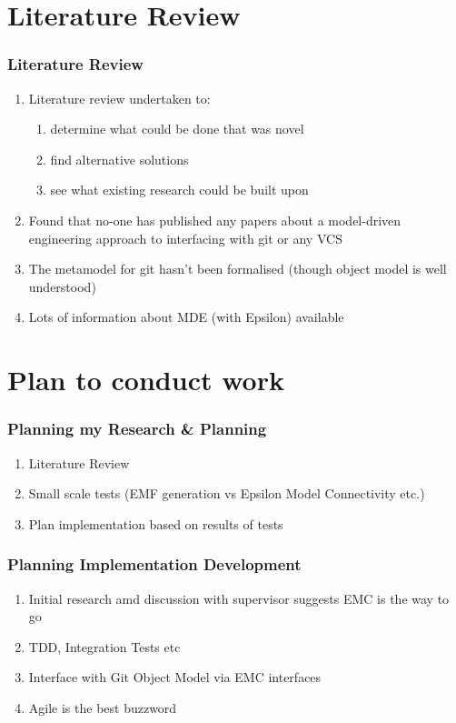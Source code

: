 \documentclass[aspectratio=1610]{beamer}
\begin{document}
\section{Literature Review}
\begin{frame}
\frametitle{Literature Review}
\begin{enumerate}
	\item Literature review undertaken to:
		\begin{enumerate} 
			\item determine what could be done that was novel
			\item find alternative solutions
			\item see what existing research could be built upon
		\end{enumerate}
	\item Found that no-one has published any papers about a model-driven engineering approach to interfacing with git or any VCS
	\item The metamodel for git hasn't been formalised (though object model is well understood)
	\item Lots of information about MDE (with Epsilon) available 
\end{enumerate}
\end{frame}

\section{Plan to conduct work}

\begin{frame}
\frametitle{Planning my Research \& Planning}	
\begin{enumerate}
	\item Literature Review
	\item Small scale tests (EMF generation vs Epsilon Model Connectivity etc.)
	\item Plan implementation based on results of tests
\end{enumerate}	
\end{frame}


\begin{frame}
\frametitle{Planning Implementation Development}	
\begin{enumerate}
	\item Initial research amd discussion with supervisor suggests EMC is the way to go
	\item TDD, Integration Tests etc
	\item Interface with Git Object Model via EMC interfaces
	\item Agile is the best buzzword
\end{enumerate}	
\end{frame}
\end{document}
